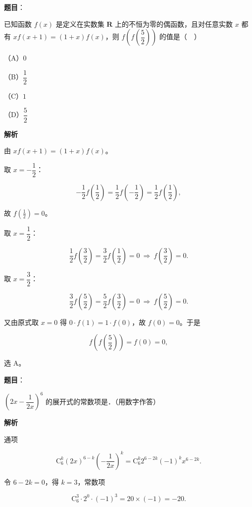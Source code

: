 \begin{answer}

\textbf{题目}：

已知函数 $f(x)$ 是定义在实数集 $\mathbf R$ 上的不恒为零的偶函数，且对任意实数 $x$ 都有 $xf(x+1)=(1+x)f(x)$，则 $f\left(f\left(\dfrac52\right)\right)$ 的值是（　）

（A）$0$

（B）$\dfrac12$

（C）$1$

（D）$\dfrac52$

\textbf{解析}

由 $xf(x+1)=(1+x)f(x)$。

取 $x=-\dfrac12$：

\nopagebreak[4]
\[-\frac12f\left(\frac12\right)=\frac12f\left(-\frac12\right)=\frac12f\left(\frac12\right),\]

故 $f\left(\frac12\right)=0$。

取 $x=\dfrac12$：

\nopagebreak[4]
\[\frac12f\left(\frac32\right)=\frac32f\left(\frac12\right)=0
\ \Longrightarrow\ f\left(\frac32\right)=0 .\]

取 $x=\dfrac32$：

\nopagebreak[4]
\[\frac32f\left(\frac52\right)=\frac52f\left(\frac32\right)=0
\ \Longrightarrow\ f\left(\frac52\right)=0 .\]

又由原式取 $x=0$ 得 $0\cdot f(1)=1\cdot f(0)$，故 $f(0)=0$。于是

\nopagebreak[4]
\[f\left(f\left(\frac52\right)\right)=f(0)=0,\]

选 A。


\end{answer}
\begin{answer}

\textbf{题目}：

$\left(2x-\dfrac1{2x}\right)^6$ 的展开式的常数项是\gkblank{}．（用数字作答）

\textbf{解析}

通项

\nopagebreak[4]
\[\mathrm C_6^k(2x)^{6-k}\left(-\frac1{2x}\right)^k
=\mathrm C_6^k2^{6-2k}(-1)^k x^{6-2k}.\]

令 $6-2k=0$，得 $k=3$，常数项

\nopagebreak[4]
\[\mathrm C_6^3\cdot2^0\cdot(-1)^3=20\times(-1)=-20 .\]


\end{answer}
